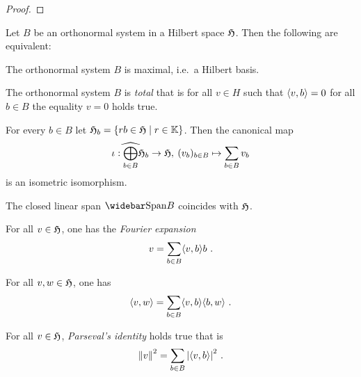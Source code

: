 \begin{proof}
  
\end{proof}

\begin{theorem}
Let $B$ be an orthonormal system in a Hilbert space $\mathfrak{H}$. Then the following are equivalent:
\begin{numberlist}
  \item\label{ite:orthonormal-system-maximal} The orthonormal system $B$ is maximal, i.e.\ a Hilbert basis.
  \item\label{ite:orthonormal-system-total} The orthonormal system $B$ is  \emph{total} that is for all $v \in H$    
      such that $\langle v, b \rangle = 0$ for all $b \in B$ the equality $v = 0$ holds true.
  \item\label{ite:orthonormal-system-isomorphism}
     For every $b\in B$ let $\mathfrak{H}_b = \{ r b \in \mathfrak{H} \mid r \in \mathbb{K}\}$. Then the canonical map 
     \[
       \iota: \widehat{\bigoplus_{b \in B}} \mathfrak{H}_b \to \mathfrak{H} , \: 
       (v_b)_{b \in B} \mapsto \sum_{b \in B} v_b
     \] 
     is an isometric isomorphism.  
  \item\label{ite:orthonormal-system-closed-span}
     The closed linear span $\clSpan{B}$ coincides with $\mathfrak{H}$.
  \item\label{ite:orthonormal-system-fourier-expansion} For all $v \in \mathfrak{H}$, one has the
    \emph{Fourier expansion}
    \[ v = \sum_{b \in B} \langle v, b \rangle b  \ . \]
  \item\label{ite:orthonormal-system-inner-product-expansion} For all $v, w \in \mathfrak{H}$, one has 
    \[ \langle v, w \rangle = \sum_{b \in B}\langle v, b \rangle \langle b, w \rangle \ . \]
  \item\label{ite:orthonormal-system-parsevals-identity} For all $v \in \mathfrak{H}$, \emph{Parseval's identity} holds true that is
    \[ \left\|v\right\|^2 = \sum_{b \in B} {\left|\langle v, b \rangle\right|}^2  \ . \] 
\end{numberlist}
\end{theorem}

